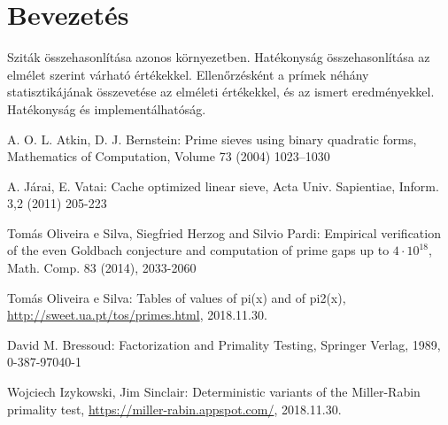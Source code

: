 \documentclass[12pt]{report}
\begin{document}
\tableofcontents

\chapter{Bevezetés}

{\color{red}
Sziták összehasonlítása azonos környezetben.
Hatékonyság összehasonlítása az elmélet szerint várható értékekkel.
Ellenőrzésként a prímek néhány statisztikájának összevetése az elméleti értékekkel,
és az ismert eredményekkel.
Hatékonyság és implementálhatóság.
}









\begin{thebibliography}{9}

A. O. L. Atkin, D. J. Bernstein: Prime sieves using binary quadratic forms, Mathematics of Computation, Volume 73 (2004) 1023–1030

A. Járai, E. Vatai: Cache optimized linear sieve, Acta Univ. Sapientiae, Inform. 3,2 (2011) 205-223

Tomás Oliveira e Silva, Siegfried Herzog and Silvio Pardi: Empirical verification of the even Goldbach conjecture and computation of prime gaps up to $4\cdot10^{18}$, Math. Comp. 83 (2014), 2033-2060

Tomás Oliveira e Silva: Tables of values of pi(x) and of pi2(x), \url{http://sweet.ua.pt/tos/primes.html}, 2018.11.30.

David M. Bressoud: Factorization and Primality Testing, Springer Verlag, 1989, 0-387-97040-1

Wojciech Izykowski, Jim Sinclair: Deterministic variants of the Miller-Rabin primality test, \url{https://miller-rabin.appspot.com/}, 2018.11.30.

\end{thebibliography}
\end{document}
